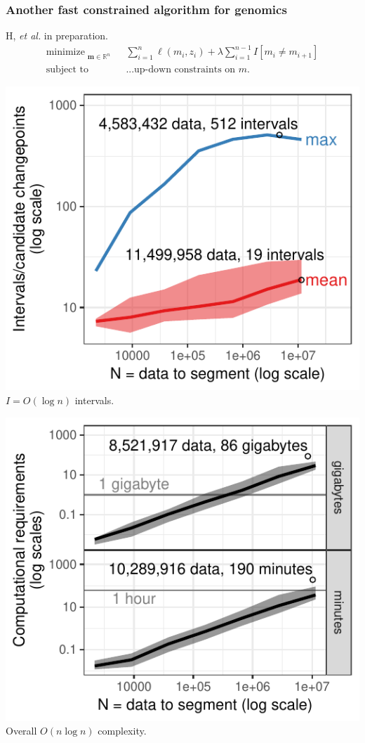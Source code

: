 \documentclass{beamer}
\DeclareMathOperator*{\minimize}{minimize}
\newcommand{\RR}{\mathbb R}
\begin{document}
\begin{frame}[fragile]
  \frametitle{Another fast constrained algorithm for genomics}

  H, {\it et al.} in preparation.
\vskip -0.5cm
\begin{align*}
    \minimize_{\substack{
  \mathbf m\in\RR^{n}
  }} &\ \ 
    \sum_{i=1}^n \ell( m_i,  z_i)  + \lambda{\sum_{i=1}^{n-1}I[m_{i}\neq m_{i+1}]}
\\
      \text{subject to} &\ \ \text{...up-down constraints on $m$.}
  \nonumber 
\end{align*}

  \begin{minipage}{0.48\textwidth}
    \includegraphics[width=\textwidth]{jss-figure-target-intervals-models}
    $I=O(\log n)$ intervals.
  \end{minipage}
  \begin{minipage}{0.48\textwidth}
    \includegraphics[width=\textwidth]{jss-figure-target-intervals-models-computation}
    Overall  $O(n \log n)$ complexity.
  \end{minipage}
  


\end{frame}
\end{document}
